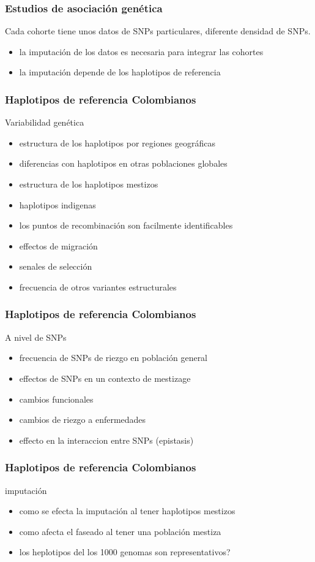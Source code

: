 \documentclass{beamer}\usepackage[]{graphicx}\usepackage[]{color}
\begin{document}
\begin{frame}[fragile]
\frametitle{Estudios de asociaci\'on gen\'etica}
Cada cohorte tiene unos datos de SNPs particulares, diferente densidad de SNPs.
\begin{itemize}
\item  la imputaci\'on de los datos es necesaria para integrar las cohortes
\item  la imputaci\'on depende de los haplotipos de referencia
\end{itemize}
\end{frame}



\begin{frame}[fragile]
\frametitle{Haplotipos de referencia Colombianos}

Variabilidad gen\'etica
\begin{itemize}
\item  estructura de los haplotipos por regiones geogr\'aficas
\item  diferencias con haplotipos en otras poblaciones globales
\item  estructura de los haplotipos mestizos
\item  haplotipos indigenas
\item  los puntos de recombinaci\'on son facilmente identificables 
\item  effectos de migraci\'on
\item  senales de selecci\'on
\item  frecuencia de otros variantes estructurales
\end{itemize}

\end{frame}


\begin{frame}[fragile]
\frametitle{Haplotipos de referencia Colombianos}
A nivel de SNPs
\begin{itemize}
\item  frecuencia de SNPs de riezgo en poblaci\'on general
\item  effectos de SNPs en un contexto de mestizage
\item  cambios funcionales
\item  cambios de riezgo a enfermedades
\item  effecto en la interaccion entre SNPs (epistasis)
\end{itemize}
\end{frame}


\begin{frame}[fragile]
\frametitle{Haplotipos de referencia Colombianos}

imputaci\'on
\begin{itemize}
\item  como se efecta la imputaci\'on al tener haplotipos mestizos
\item  como afecta el faseado al tener una poblaci\'on mestiza
\item  los heplotipos del los 1000 genomas son representativos? 
\end{itemize}
\end{frame}
\end{document}
